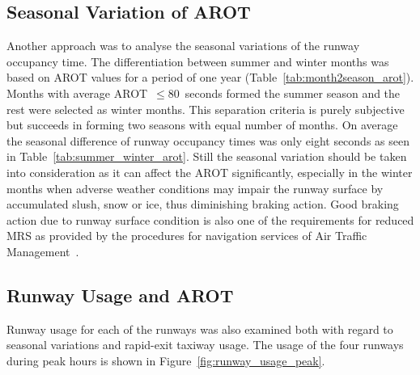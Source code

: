 \subsection{Seasonal Variation of AROT\label{ssec:seasonal_arot}}
Another approach was to analyse the seasonal variations of the runway occupancy time. The differentiation between summer and winter months was based on AROT values for a period of one year (Table~\ref{tab:month2season_arot}). Months with average AROT~$\leq$80~seconds formed the summer season and the rest were selected as winter months. This separation criteria is purely subjective but succeeds in forming two seasons with equal number of months. On average the seasonal difference of runway occupancy times was only eight seconds as seen in Table~\ref{tab:summer_winter_arot}. Still the seasonal variation should be taken into consideration as it can affect the AROT significantly, especially in the winter months when adverse weather conditions may impair the runway surface by accumulated slush, snow or ice, thus diminishing braking action. Good braking action due to runway surface condition is also one of the requirements for reduced MRS as provided by the procedures for navigation services of Air Traffic Management~\cite{doc44444}.

\begin{table}[h]
\centering
{}
\caption[AROTs for the air traffic mix by season]{AROT statistics for the air traffic mix at BIKF by season. The count is the number of landings during peak hours over a 13 month period starting October 2017.}
\label{tab:summer_winter_arot}
\end{table}

\subsection{Runway Usage and AROT\label{ssec:runway_usage_arot}}
Runway usage for each of the runways was also examined both with regard to seasonal variations and rapid-exit taxiway usage. The usage of the four runways during peak hours is shown in Figure~\ref{fig:runway_usage_peak}. 

